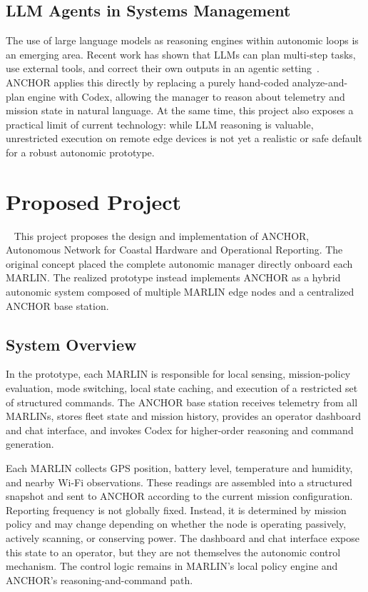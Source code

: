 \documentclass[journal]{IEEEtran}
\begin{document}
\subsection{LLM Agents in Systems Management}
The use of large language models as reasoning engines within autonomic loops is an emerging area. Recent work has shown that LLMs can plan multi-step tasks, use external tools, and correct their own outputs in an agentic setting~\cite{yao2023react}. ANCHOR applies this directly by replacing a purely hand-coded analyze-and-plan engine with Codex, allowing the manager to reason about telemetry and mission state in natural language. At the same time, this project also exposes a practical limit of current technology: while LLM reasoning is valuable, unrestricted execution on remote edge devices is not yet a realistic or safe default for a robust autonomic prototype.

\section{Proposed Project}~\label{design}
This project proposes the design and implementation of ANCHOR, Autonomous Network for Coastal Hardware and Operational Reporting. The original concept placed the complete autonomic manager directly onboard each MARLIN. The realized prototype instead implements ANCHOR as a hybrid autonomic system composed of multiple MARLIN edge nodes and a centralized ANCHOR base station.

\subsection{System Overview}
In the prototype, each MARLIN is responsible for local sensing, mission-policy evaluation, mode switching, local state caching, and execution of a restricted set of structured commands. The ANCHOR base station receives telemetry from all MARLINs, stores fleet state and mission history, provides an operator dashboard and chat interface, and invokes Codex for higher-order reasoning and command generation.

Each MARLIN collects GPS position, battery level, temperature and humidity, and nearby Wi-Fi observations. These readings are assembled into a structured snapshot and sent to ANCHOR according to the current mission configuration. Reporting frequency is not globally fixed. Instead, it is determined by mission policy and may change depending on whether the node is operating passively, actively scanning, or conserving power. The dashboard and chat interface expose this state to an operator, but they are not themselves the autonomic control mechanism. The control logic remains in MARLIN's local policy engine and ANCHOR's reasoning-and-command path.
\end{document}
